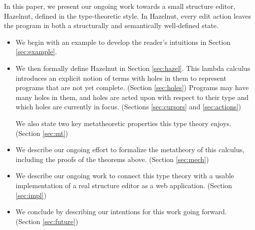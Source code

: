 In this paper, we present our ongoing work towards a small structure editor, Hazelnut,  defined in the type-theoretic style. In Hazelnut, every edit action leaves the program in both a structurally and semantically well-defined state.
\begin{itemize}
  \item We begin with an example to develop the reader's intuitions in Section
    \ref{sec:example}.

  \item We then formally define Hazelnut in Section \ref{sec:hazel}. This
    lambda calculus introduces an explicit notion of terms with holes in
    them to represent programs that are not yet complete.
    (Section \ref{sec:holes}) Programs may have many holes in them, and
    holes are acted upon with respect to their type and which holes are
    currently in focus. (Sections \ref{sec:cursors} and \ref{sec:actions})

    We also state two key metatheoretic properties this type theory
    enjoys. (Section \ref{sec:mt})

  \item We describe our ongoing effort to formalize the metatheory of this
    calculus, including the proofs of the theorems
    above. (Section \ref{sec:mech})

  \item We describe our ongoing work to connect this type theory with a
    usable implementation of a real structure editor as a web
    application. (Section \ref{sec:impl})

  \item We conclude by describing our intentions for this work going
    forward. (Section \ref{sec:future})
\end{itemize}
